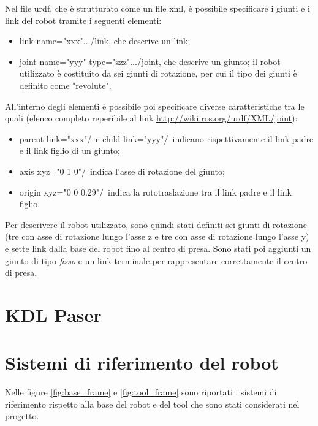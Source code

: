 Nel file urdf, che è strutturato come un file xml, è possibile specificare i giunti e i link del robot tramite i seguenti elementi:
\begin{itemize}
	\item \tl link name="xxx"\tr...\tl /link\tr, che descrive un link;
	\item \tl joint name="yyy" type="zzz"\tr...\tl /joint\tr, che descrive un giunto; il robot utilizzato è costituito da sei giunti di rotazione, per cui il tipo dei giunti è definito come "revolute".
\end{itemize}
All'interno degli elementi è possibile poi specificare diverse caratteristiche tra le quali (elenco completo reperibile al link \url{http://wiki.ros.org/urdf/XML/joint}):
\begin{itemize}
	\item  \tl parent link="xxx"/\tr\ e \tl child link="yyy"/\tr\ indicano rispettivamente il link padre e il link figlio di un giunto;
	\item \tl axis xyz="0 1 0"/\tr\ indica l'asse di rotazione del giunto;
	\item  \tl origin xyz="0 0 0.29"/\tr\ indica la rototraslazione tra il link padre e il link figlio.
\end{itemize}
Per descrivere il robot utilizzato, sono quindi stati definiti sei giunti di rotazione (tre con asse di rotazione lungo l'asse z e tre con asse di rotazione lungo l'asse y) e sette link dalla base del robot fino al centro di presa. Sono stati poi aggiunti un giunto di tipo \textit{fisso} e un link terminale per rappresentare correttamente il centro di presa.

\clearpage

\section{KDL Paser}


\section{Sistemi di riferimento del robot}

Nelle figure \ref{fig:base_frame} e \ref{fig:tool_frame} sono riportati i sistemi di riferimento rispetto alla base del robot e del tool che sono stati considerati nel progetto.

